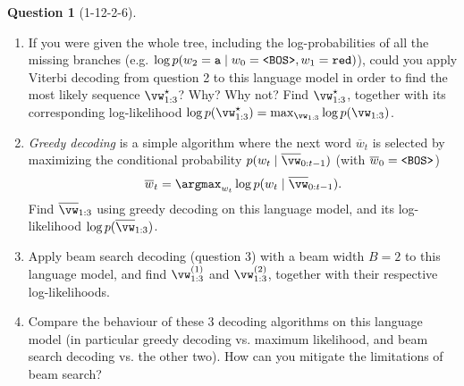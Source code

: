 \documentclass[12pt]{article}
\theoremstyle{definition}
\newtheorem{exercise}{Question}%
\begin{document}
\begin{exercise}[1-12-2-6]
{\begin{enumerate}[label=\arabic{exercise}.\arabic*]
\begin{minipage}{\linewidth}
    \end{minipage}
    
    \begin{enumerate}[label=\arabic{exercise}.\arabic{enumi}.\alph*]
        \item If you were given the whole tree, including the log-probabilities of all the missing branches (e.g. $\log p(w_{2} = \textrm{\texttt{a}} \mid w_{0} = \textrm{\texttt{<BOS>}}, w_{1} = \textrm{\texttt{red}})$), could you apply Viterbi decoding from question 2 to this language model in order to find the most likely sequence $\vw_{1:3}^{\star}$? Why? Why not? Find $\vw_{1:3}^{\star}$, together with its corresponding log-likelihood $\log p(\vw_{1:3}^{\star}) = \max_{\vw_{1:3}} \log p(\vw_{1:3})$.
        
        \item \emph{Greedy decoding} is a simple algorithm where the next word $\overline{w}_{t}$ is selected by maximizing the conditional probability $p(w_{t}\mid \overline{\vw}_{0:t-1})$ (with $\overline{w}_{0} = \textrm{\texttt{<BOS>}}$)
        \begin{equation*}
            \overline{w}_{t} = \argmax_{w_{t}} \log p(w_{t}\mid \overline{\vw}_{0:t-1}).
        \end{equation*}
        Find $\overline{\vw}_{1:3}$ using greedy decoding on this language model, and its log-likelihood $\log p(\overline{\vw}_{1:3})$.
        
        \item Apply beam search decoding (question 3) with a beam width $B = 2$ to this language model, and find $\vw_{1:3}^{(1)}$ and $\vw_{1:3}^{(2)}$, together with their respective log-likelihoods.
        
        \item Compare the behaviour of these 3 decoding algorithms on this language model (in particular greedy decoding vs. maximum likelihood, and beam search decoding vs. the other two). How can you mitigate the limitations of beam search?
    \end{enumerate}
\end{enumerate}
}


\end{exercise}
\end{document}
